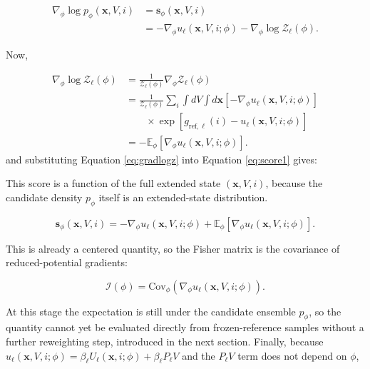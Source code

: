 \begin{align}
    \nabla_{\phi}\log p_\phi(\mathbf{x}, V, i)
    &=
    \mathbf{s}_\phi(\mathbf{x}, V, i)
    \nonumber\\
    &=
    -
    \nabla_\phi u_\ell(\mathbf{x}, V, i; \phi)
    -
    \nabla_\phi \log \mathcal{Z}_\ell(\phi).
    \label{eq:score1}
\end{align}

Now,

\begin{align}
    \nabla_\phi \log \mathcal{Z}_\ell(\phi)
    &=
    \frac{1}{\mathcal{Z}_\ell(\phi)}
    \nabla_\phi \mathcal{Z}_\ell(\phi)
    \nonumber \\
    &=
    \frac{1}{\mathcal{Z}_\ell(\phi)}
    \sum_i \int dV \int d\mathbf{x}
    \left[
        -
        \nabla_\phi u_\ell(\mathbf{x}, V, i; \phi)
    \right]
    \nonumber \\
    &\qquad \times
    \exp \left[
        g_{\mathrm{ref},\ell}(i)
        -
        u_\ell(\mathbf{x}, V, i; \phi)
    \right]
    \nonumber \\
    &=
    -
    \mathbb{E}_\phi
    \left[
        \nabla_\phi u_\ell(\mathbf{x}, V, i; \phi)
    \right].
    \label{eq:gradlogz}
\end{align}
%
and substituting Equation \eqref{eq:gradlogz} into Equation \eqref{eq:score1} gives:

This score is a function of the full extended state $(\mathbf{x}, V, i)$, because the candidate density $p_\phi$ itself is an extended-state distribution.

\begin{equation}
    \mathbf{s}_\phi(\mathbf{x}, V, i)
    =
    -
    \nabla_\phi u_\ell(\mathbf{x}, V, i; \phi)
    +
    \mathbb{E}_\phi
    \left[
        \nabla_\phi u_\ell(\mathbf{x}, V, i; \phi)
    \right].
    \label{eq:score2}
\end{equation}

This is already a centered quantity, so the Fisher matrix is the covariance of reduced-potential gradients:

\begin{equation}
    \mathcal{I}(\phi)
    =
    \mathrm{Cov}_\phi
    \left(
        \nabla_\phi u_\ell(\mathbf{x}, V, i; \phi)
    \right).
    \label{eq:fimcovu}
\end{equation}

At this stage the expectation is still under the candidate ensemble $p_\phi$, so the quantity cannot yet be evaluated directly from frozen-reference samples without a further reweighting step, introduced in the next section. Finally, because $u_\ell(\mathbf{x}, V, i; \phi) = \beta_\ell U_\ell(\mathbf{x}, i; \phi) + \beta_\ell P_\ell V$ and the $P_\ell V$ term does not depend on $\phi$,

